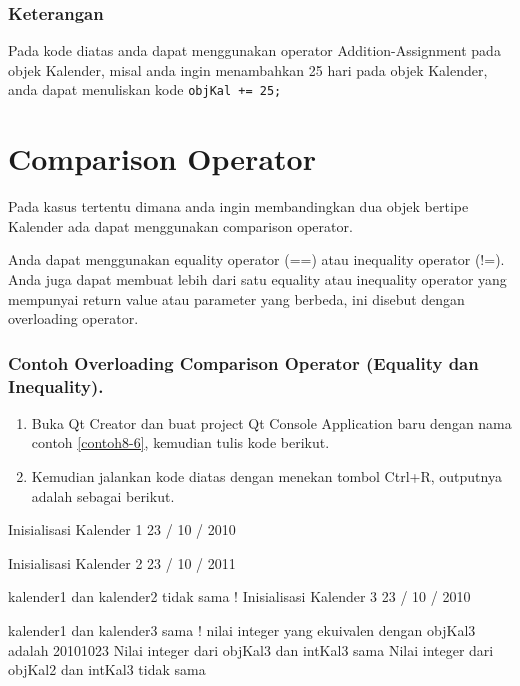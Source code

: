 \subsubsection*{Keterangan}

Pada kode diatas anda dapat menggunakan operator Addition-Assignment
pada objek Kalender, misal anda ingin menambahkan 25 hari pada objek
Kalender, anda dapat menuliskan kode \texttt{objKal\ +=\ 25;}

\section{Comparison Operator}\label{comparison-operator}

Pada kasus tertentu dimana anda ingin membandingkan dua objek bertipe
Kalender ada dapat menggunakan comparison operator.



Anda dapat menggunakan equality operator (==) atau inequality operator
(!=). Anda juga dapat membuat lebih dari satu equality atau inequality
operator yang mempunyai return value atau parameter yang berbeda, ini
disebut dengan overloading operator.

\subsubsection*{Contoh  Overloading Comparison Operator (Equality dan Inequality).}

\begin{enumerate}

\item
  Buka Qt Creator dan buat project Qt Console Application baru dengan
  nama contoh \ref{contoh8-6}, kemudian tulis kode berikut.




\item
  Kemudian jalankan kode diatas dengan menekan tombol Ctrl+R, outputnya
  adalah sebagai berikut.
\end{enumerate}

\begin{lcverbatim}
Inisialisasi Kalender 1
23 / 10 / 2010

Inisialisasi Kalender 2
23 / 10 / 2011

kalender1 dan kalender2 tidak sama !
Inisialisasi Kalender 3
23 / 10 / 2010

kalender1 dan kalender3 sama !
nilai integer yang ekuivalen dengan objKal3 adalah 20101023
Nilai integer dari objKal3 dan intKal3 sama
Nilai integer dari objKal2 dan intKal3 tidak sama
\end{lcverbatim}

